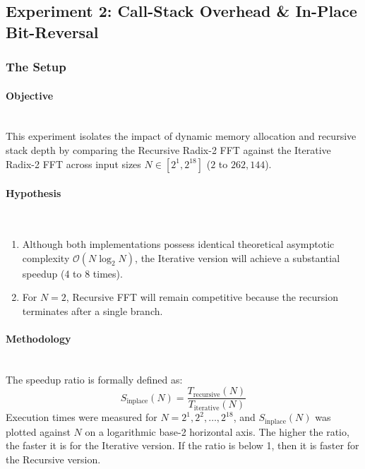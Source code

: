 \documentclass{article}
\begin{document}
\subsection{Experiment 2: Call-Stack Overhead \& In-Place Bit-Reversal} \label{sec:exp2_design}
\subsubsection*{The Setup}
\paragraph{Objective}~{}\\
This experiment isolates the impact of dynamic memory allocation and recursive stack depth by comparing the Recursive Radix-2 FFT against the Iterative Radix-2 FFT across input sizes $N \in [2^1, 2^{18}]$ ($2$ to $262,144$).


\paragraph{Hypothesis}~{}\\
\begin{enumerate}
    \item Although both implementations possess identical theoretical asymptotic complexity $\mathcal{O}(N \log_2 N)$, the Iterative version will achieve a substantial speedup (4 to 8 times).
    \item For $N = 2$, Recursive FFT will remain competitive because the recursion terminates after a single branch.
\end{enumerate}

\paragraph{Methodology}~{}\\
The speedup ratio is formally defined as:
\begin{equation}
S_{\text{inplace}}(N) = \frac{T_{\text{recursive}}(N)}{T_{\text{iterative}}(N)}
\end{equation}
Execution times were measured for $N = 2^1, 2^2, \dots, 2^{18}$, and $S_{\text{inplace}}(N)$ was plotted against $N$ on a logarithmic base-2 horizontal axis. The higher the ratio, the faster it is for the Iterative version. If the ratio is below 1, then it is faster for the Recursive version.
\end{document}

